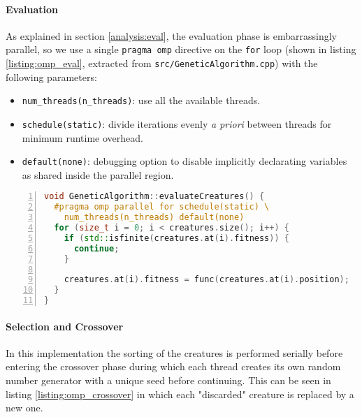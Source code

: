 \documentclass[12pt,a4paper,oneside]{article}
\begin{document}
	\paragraph{Evaluation}
	As explained in section \ref{analysis:eval}, the evaluation phase is embarrassingly parallel, so we use a single \texttt{pragma omp} directive on the \texttt{for} loop (shown in listing \ref{listing:omp_eval}, extracted from \texttt{src/GeneticAlgorithm.cpp}) with the following parameters:
	\begin{itemize}
		\item \texttt{num\_threads(n\_threads)}: use all the available threads.
		\item \texttt{schedule(static)}: divide iterations evenly \textit{a priori} between threads for minimum runtime overhead.
		\item \texttt{default(none)}: debugging option to disable implicitly declarating variables as shared inside the parallel region.
	\end{itemize}

	\begin{lstlisting}[language=C++,
		directivestyle={\color{black}},
		backgroundcolor=\color{lgrey},
    	basicstyle=\footnotesize \ttfamily \color{black} \bfseries,
		numbers=left,
		numbersep=5pt,
    	numberstyle=\tiny\color{black},
    	rulecolor=\color{black},
    	keywordstyle=\color{purple},
    	morekeywords={size_t,std},
    	captionpos=b,
    	caption={Parallel evaluation phase in OpenMP.},
    	label={listing:omp_eval}
	   ]
void GeneticAlgorithm::evaluateCreatures() {
  #pragma omp parallel for schedule(static) \
    num_threads(n_threads) default(none)
  for (size_t i = 0; i < creatures.size(); i++) {
    if (std::isfinite(creatures.at(i).fitness)) {
      continue;
    }

    creatures.at(i).fitness = func(creatures.at(i).position);
  }
}
	\end{lstlisting}
	
	\paragraph{Selection and Crossover}
	In this implementation the sorting of the creatures is performed serially before entering the crossover phase during which each thread creates its own random number generator with a unique seed before continuing.
	This can be seen in listing \ref{listing:omp_crossover} in which each "discarded" creature is replaced by a new one.
\end{document}

